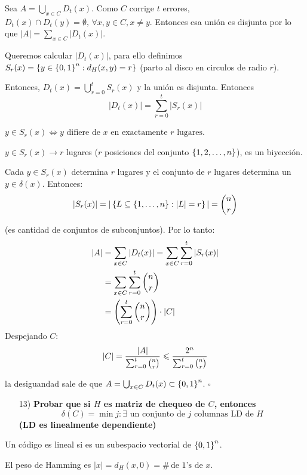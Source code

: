 \documentclass[12pt,a4paper]{article}
\begin{document}
Sea $A = \bigcup_{x\in C} D_{t}(x)$. Como $C$ corrige $t$ errores, 
$D_{t}(x) \cap D_{t}(y) = \emptyset,\, \forall x,y\in C, x\neq y$. Entonces esa 
unión es disjunta por lo que $|A| = \sum_{x\in C} |D_{t}(x)|$.
\medskip

Queremos calcular $|D_{t}(x)|$, para ello definimos $S_{r}(x) = \left\lbrace y\in \left\lbrace 0,1 \right\rbrace^{n}: d_{H}(x,y)=r \right\rbrace$ 
(parto al disco en circulos de radio $r$).
\medskip

Entonces, $D_{t}(x) = \bigcup_{r=0}^{t} S_{r}(x)$ y la unión es disjunta. Entonces 
$$|D_{t}(x)| = \sum_{r=0}^{t} |S_{r}(x)|$$

$y\in S_{r}(x) \iff y\,\, \text{difiere de $x$ en exactamente $r$ lugares}$.
\medskip

$y\in S_{r}(x) \to r$ lugares ($r$ posiciones del conjunto $\left\lbrace 1,2, \ldots, n \right\rbrace$), 
es un biyección.
\medskip

Cada $y\in S_{r}(x)$ determina $r$ lugares y el conjunto de $r$ lugares determina 
un $y\in \delta(x)$. Entonces:
$$|S_{r}(x)| = |\left\lbrace L \subseteq \left\lbrace 1,\ldots,n \right\rbrace:|L|=r \right\rbrace| = \binom{n}{r}$$

(es cantidad de conjuntos de subconjuntos). Por lo tanto:
\begin{align*}
    |A| &= \sum_{x\in C} |D_{t}(x)| = \sum_{x\in C} \sum_{r=0}^{t} |S_{r}(x)|\\
    &= \sum_{x\in C} \sum_{r=0}^{t} \binom{n}{r}\\
    &= \left(\sum_{r=0}^{t} \binom{n}{r}\right) \cdot |C|\\
\end{align*}
Despejando $C$:
$$|C| = \frac{|A|}{\sum_{r=0}^{t} \binom{n}{r}}\leqslant \frac{2^{n}}{\sum_{r=0}^{t} \binom{n}{r}}$$

la desiguandad sale de que $A = \bigcup_{x\in C} D_{t}(x) \subset \left\lbrace 0,1 \right\rbrace^{n}$.
$\square$

\begin{itemize}
    \item [13)] \textbf{Probar que si $H$ es matriz de chequeo de $C$, entonces
        $$\delta(C) = \min {j: \exists \,\,\text{un conjunto de $j$ columnas LD de $H$}}$$
        (LD es linealmente dependiente)}
    \label{dem:delta}
\end{itemize}

Un código es lineal si es un subespacio vectorial de $\left\lbrace 0,1 \right\rbrace^{n}$.

\begin{definition} El peso de Hamming es $|x|=d_{H}(x,0)=\# \, \text{de 1's de $x$}$.
\end{definition}
\end{document}
